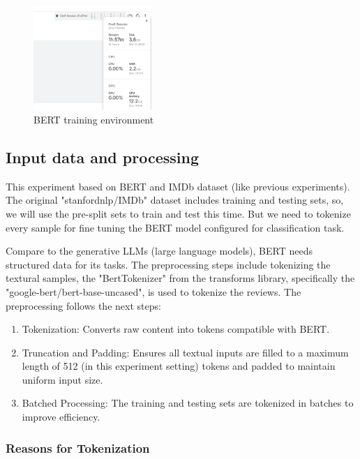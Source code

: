 \begin{figure}[ht]
    \centering
    \includegraphics[width=0.4\textwidth]{pics/bert_consuming.png}
    \caption{BERT training environment}
\end{figure}

\subsection{Input data and processing}
This experiment based on BERT and IMDb dataset (like previous experiments). The original "stanfordnlp/IMDb" dataset includes training and testing sets, so, we will use the pre-split sets to train and test this time. But we need to tokenize every sample for fine tuning the BERT model configured for classification task.

Compare to the generative LLMs (large language models), BERT needs structured data for its tasks.
The preprocessing steps include tokenizing the textural samples, the "BertTokenizer" from the transforms library, specifically the "google-bert/bert-base-uncased", is used to tokenize the reviews. The preprocessing follows the next steps:

\begin{enumerate}
    \item Tokenization: Converts raw content into tokens compatible with BERT.
    \item Truncation and Padding: Ensures all textual inputs are filled to a maximum length of 512 (in this experiment setting) tokens and padded to maintain uniform input size.
    \item Batched Processing: The training and testing sets are tokenized in batches to improve efficiency.
\end{enumerate}

\subsubsection{Reasons for Tokenization}

